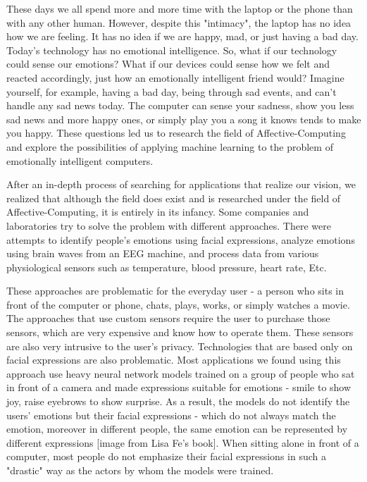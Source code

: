 
These days we all spend more and more time with the laptop or the phone than with any other human. However, despite this "intimacy", 
the laptop has no idea how we are feeling. It has no idea if we are happy, mad, or just having a bad day. Today's technology has no emotional intelligence. 
So, what if our technology could sense our emotions? What if our devices could sense how we felt and reacted accordingly, just how an emotionally intelligent friend would?  Imagine yourself, for example, having a bad day, being through sad events, and can't handle any sad news today. 
The computer can sense your sadness, show you less sad news and more happy ones, or simply play you a song it knows tends to make you happy.
These questions led us to research the field of Affective-Computing and explore the possibilities of applying machine learning to the problem of emotionally intelligent computers.

After an in-depth process of searching for applications that realize our vision, 
we realized that although the field does exist and is researched under the field of Affective-Computing, 
it is entirely in its infancy. Some companies and laboratories try to solve the problem with different approaches. 
There were attempts to identify people's emotions using facial expressions, analyze emotions using brain waves from an EEG machine, 
and process data from various physiological sensors such as temperature, blood pressure, heart rate, Etc.

These approaches are problematic for the everyday user - a person who sits in front of the computer or phone, chats, 
plays, works, or simply watches a movie. The approaches that use custom sensors require the user to purchase those sensors, 
which are very expensive and know how to operate them. These sensors are also very intrusive to the user's privacy. 
Technologies that are based only on facial expressions are also problematic. Most applications we found using this approach use heavy neural network
models trained on a group of people who sat in front of a camera and made expressions suitable for emotions - smile to show joy, raise eyebrows to show surprise.
As a result, the models do not identify the users' emotions but their facial expressions - which do not always match the emotion, moreover in different people, 
the same emotion can be represented by different expressions [image from Lisa Fe's book]. 
When sitting alone in front of a computer, most people do not emphasize their facial expressions in such a "drastic" way as the actors by whom the 
models were trained.

